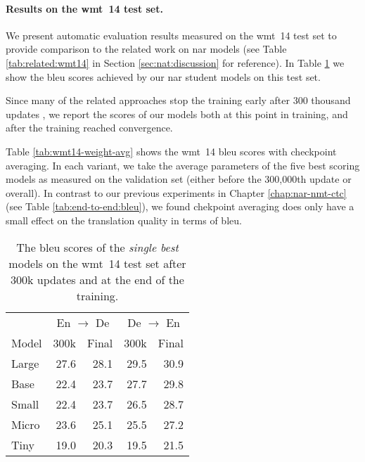 \paragraph{Results on the \acs{wmt}~14 test set.}
We present automatic evaluation results measured on the \acs{wmt}~14 test set
to provide comparison to the related work on \acl{nar} models (see Table
\ref{tab:related:wmt14} in Section \ref{sec:nat:discussion} for reference).  In
Table \ref{tab:wmt14-bleu-scores} we show the \acs{bleu} scores achieved by our
\ac{nar} student models on this test set.

Since many of the related approaches stop the training early after 300 thousand
updates \citep{gu2017nonautoregressive, gu-kong-2021-fully}, we report the
scores of our models both at this point in training, and after the training
reached convergence.

Table \ref{tab:wmt14-weight-avg} shows the \acs{wmt}~14 \acs{bleu} scores with
checkpoint averaging. In each variant, we take the average parameters of the
five best scoring models as measured on the validation set (either before the
300,000th update or overall). In contrast to our previous experiments in
Chapter \ref{chap:nar-nmt-ctc} (see Table \ref{tab:end-to-end:bleu}), we found
chekpoint averaging does only have a small effect on the translation quality in
terms of \acs{bleu}.

\begin{table}
  \centering
  \begin{tabular}{lrrrr}
    \toprule
    & \multicolumn{2}{c}{En $\rightarrow$ De}
    & \multicolumn{2}{c}{De $\rightarrow$ En} \\
    Model
    & 300k & Final & 300k &  Final \\
    \midrule

    Large & 27.6 & 28.1 & 29.5 & 30.9 \\
    Base  & 22.4 & 23.7 & 27.7 & 29.8 \\
    Small & 22.4 & 23.7 & 26.5 & 28.7 \\
    Micro & 23.6 & 25.1 & 25.5 & 27.2 \\
    Tiny  & 19.0 & 20.3 & 19.5 & 21.5 \\

    \bottomrule
  \end{tabular}

  \caption{The \acs{bleu} scores of the \emph{single best} models on the
    \acs{wmt}~14 test set after 300k updates and at the end of the training.}%
  \label{tab:wmt14-bleu-scores}
\end{table}

